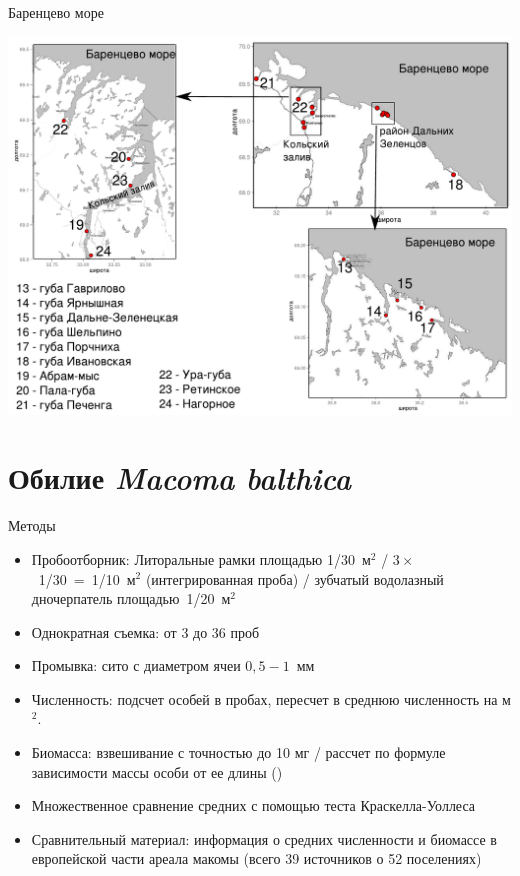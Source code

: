 \documentclass{beamer}
\begin{document}
\begin{frame}{Баренцево море}
 \begin{center}
	\includegraphics[height=.8\textheight]{./Barents_sea.pdf}
 \end{center}
\end{frame}

		\section[Обилие]{Обилие {\it Macoma balthica}}
\begin{frame}{Методы}
	\begin{itemize}
		\item Пробоотборник: Литоральные рамки площадью 1/30~м$^2$ / $3 \times$~1/30~=~1/10~м$^2$ (интегрированная проба) / зубчатый водолазный дночерпатель площадью~1/20~м$^2$
		\item Однократная съемка: от 3 до 36 проб
		\item Промывка: сито с диаметром ячеи $0,5 - 1$~мм 
		\item Численность: подсчет особей в пробах, пересчет в среднюю численность на м$^2$. 
		\item Биомасса: взвешивание с точностью до 10 мг / рассчет по формуле зависимости массы особи от ее длины (\cite{Maximovich_et_al_1993})
		\item Множественное сравнение средних с помощью теста Краскелла-Уоллеса
		\item Сравнительный материал: информация о средних численности и биомассе в европейской части ареала макомы (всего 39 источников о 52 поселениях)
	\end{itemize}
\end{frame}
\end{document}

